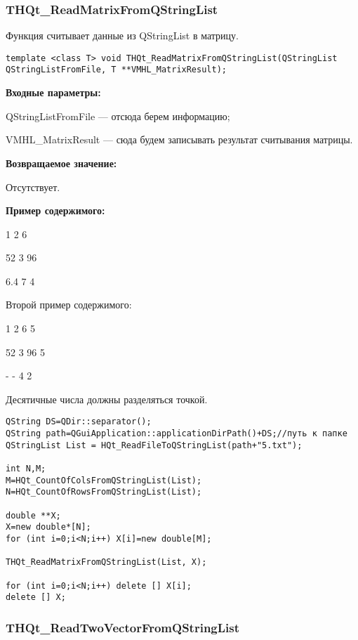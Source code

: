 \documentclass[a4paper,12pt]{article}
\begin{document}
\subsubsection{THQt\_ReadMatrixFromQStringList}\label{THQt_ReadMatrixFromQStringList}

Функция считывает данные из QStringList в матрицу.


\begin{lstlisting}[label=code_syntax_THQt_ReadMatrixFromQStringList,caption=Синтаксис]
template <class T> void THQt_ReadMatrixFromQStringList(QStringList QStringListFromFile, T **VMHL_MatrixResult);
\end{lstlisting}

\textbf{Входные параметры:}

 
QStringListFromFile --- отсюда берем информацию;

VMHL\_MatrixResult --- сюда будем записывать результат считывания матрицы.

\textbf{Возвращаемое значение:}

Отсутствует.

\textbf{Пример содержимого:}

1	2	6

52	3	96

6.4	7	4

    Второй пример содержимого:
	
1	2	6	5

52	3	96	5

-	-	4   2

Десятичные числа должны разделяться точкой.


\begin{lstlisting}[label=code_use_THQt_ReadMatrixFromQStringList,caption=Пример использования]
QString DS=QDir::separator();
QString path=QGuiApplication::applicationDirPath()+DS;//путь к папке
QStringList List = HQt_ReadFileToQStringList(path+"5.txt");

int N,M;
M=HQt_CountOfColsFromQStringList(List);
N=HQt_CountOfRowsFromQStringList(List);

double **X;
X=new double*[N];
for (int i=0;i<N;i++) X[i]=new double[M];

THQt_ReadMatrixFromQStringList(List, X);

for (int i=0;i<N;i++) delete [] X[i];
delete [] X;
\end{lstlisting}

\subsubsection{THQt\_ReadTwoVectorFromQStringList}\label{THQt_ReadTwoVectorFromQStringList}
\end{document}
